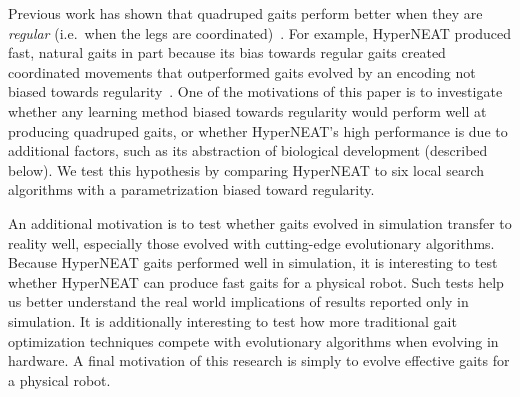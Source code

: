 Previous work has shown that quadruped gaits perform better when they
are \emph{regular} (i.e.\ when the legs are
coordinated)~\citep{clune2009evolving,
  clune2011performance,valsalam2008modular}. For example, HyperNEAT
produced fast, natural gaits in part because its bias towards regular
gaits created coordinated movements that outperformed gaits evolved by
an encoding not biased towards regularity~\citep{clune2009evolving,
  clune2011performance}. One of the motivations of this paper is to
investigate whether any learning method biased towards regularity
would perform well at producing quadruped gaits, or whether
HyperNEAT's high performance is due to additional factors, such as its
abstraction of biological development (described below). We test this
hypothesis by comparing HyperNEAT to six local search algorithms with
a parametrization biased toward regularity.

An additional motivation is to test whether gaits evolved in simulation transfer to reality well, especially those evolved with cutting-edge evolutionary algorithms. Because HyperNEAT gaits performed well in
simulation, it is interesting to test whether HyperNEAT can produce fast
gaits for a physical robot. Such tests help us better understand the real world implications of results reported only in simulation. It is additionally interesting to test how
more traditional gait optimization techniques compete with
evolutionary algorithms when evolving in hardware. A final motivation of this research is simply to evolve effective gaits for a physical robot.




%  
%  
% 


